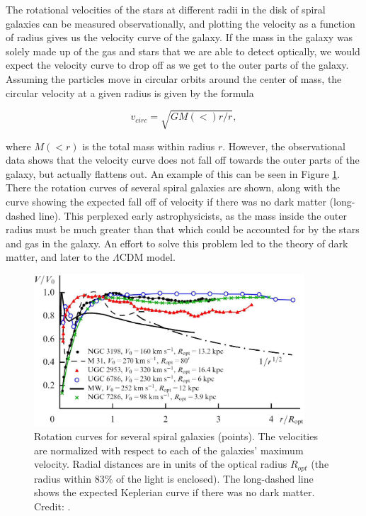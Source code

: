 The rotational velocities of the stars at different radii in the disk of spiral galaxies can be measured observationally, and plotting the velocity as a function of radius gives us the velocity curve of the galaxy. If the mass in the galaxy was solely made up of the gas and stars that we are able to detect optically, we would expect the velocity curve to drop off as we get to the outer parts of the galaxy. Assuming the particles move in circular orbits around the center of mass, the circular velocity at a given radius is given by the formula

\begin{equation}
    v_{circ} = \sqrt{GM(<)r/r}, 
\end{equation}

where $M(<r)$ is the total mass within radius $r$. However, the observational data shows that the velocity curve does not fall off towards the outer parts of the galaxy, but actually flattens out. An example of this can be seen in Figure \ref{rotation_curves}. There the rotation curves of several spiral galaxies are shown, along with the curve showing the expected fall off of velocity if there was no dark matter (long-dashed line). This perplexed early astrophysicists, as the mass inside the outer radius must be much greater than that which could be accounted for by the stars and gas in the galaxy. An effort to solve this problem led to the theory of dark matter, and later to the $\Lambda$CDM model.

\begin{figure}
    \centering
    \includegraphics[width=0.9\textwidth]{images/rotation_curves.png}
    \caption{Rotation curves for several spiral galaxies (points). The velocities are normalized with respect to each of the galaxies' maximum velocity. Radial distances are in units of the optical radius $R_{opt}$ (the radius within 83\% of the light is enclosed). The long-dashed line shows the expected Keplerian curve if there was no dark matter. Credit: \textcite{Zasov2017}.}
    \label{rotation_curves}
\end{figure}

